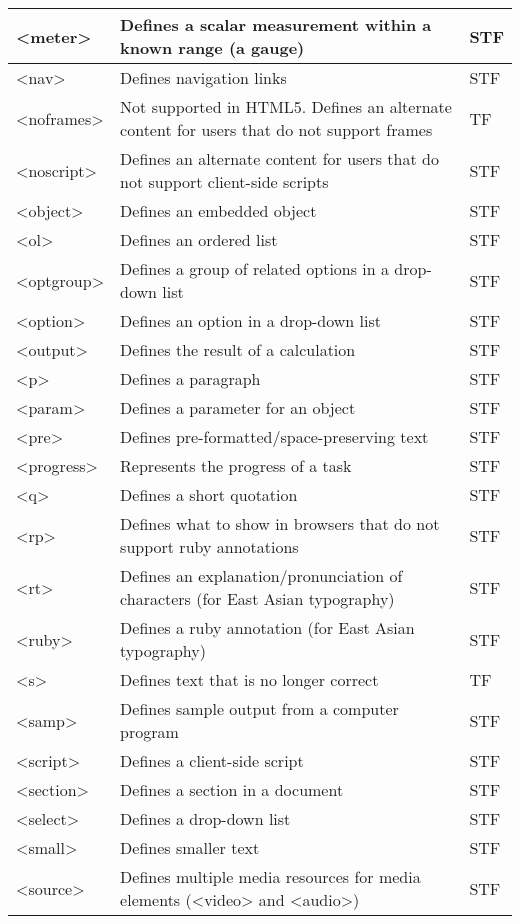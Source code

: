 \begin{longtable}{|p{60pt}|p{320pt}|p{40pt}|}
\hline
<meter>		&	Defines a scalar measurement within a known range (a gauge) & STF\\
\hline
<nav>		&	Defines navigation links & STF\\
\hline
<noframes>	&	Not supported in HTML5. Defines an alternate content for users that do not support frames & TF\\
\hline
<noscript>	&	Defines an alternate content for users that do not support client-side scripts & STF\\
\hline
<object>		&	Defines an embedded object & STF\\
\hline
<ol>			&	Defines an ordered list & STF\\
\hline
<optgroup>	&	Defines a group of related options in a drop-down list & STF\\
\hline
<option>		&	Defines an option in a drop-down list & STF\\
\hline
<output>		&	Defines the result of a calculation & STF\\
\hline
<p>			&	Defines a paragraph & STF\\
\hline
<param>		&	Defines a parameter for an object & STF\\
\hline
<pre>		&	Defines pre-formatted/space-preserving text & STF\\
\hline
<progress>	&	Represents the progress of a task & STF\\
\hline
<q>			&	Defines a short quotation & STF\\
\hline
<rp>			&	Defines what to show in browsers that do not support ruby annotations & STF\\
\hline
<rt>			&	Defines an explanation/pronunciation of characters (for East Asian typography) & STF\\
\hline
<ruby>		&	Defines a ruby annotation (for East Asian typography) & STF\\
\hline
<s>			&	Defines text that is no longer correct	& TF\\
\hline
<samp>		&	Defines sample output from a computer program & STF\\
\hline
<script>		&	Defines a client-side script & STF\\
\hline
<section>		&	Defines a section in a document & STF\\
\hline
<select>		&	Defines a drop-down list & STF\\
\hline
<small>		&	Defines smaller text & STF\\
\hline
<source>		&	Defines multiple media resources for media elements (<video> and <audio>) & STF\\

\end{longtable}
